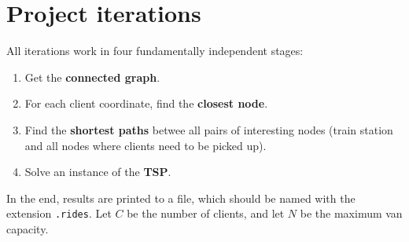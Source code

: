 \chapter{Project iterations} \label{iterations}

All iterations work in four fundamentally independent stages:
\begin{enumerate}
    \item Get the \textbf{connected graph}.
    \item For each client coordinate, find the \textbf{closest node}.
    \item Find the \textbf{shortest paths} betwee all pairs of interesting nodes (train station and all nodes where clients need to be picked up).
    \item Solve an instance of the \textbf{\acrlong*{TSP}}.
\end{enumerate}

In the end, results are printed to a file, which should be named with the extension \texttt{.rides}.
Let $C$ be the number of clients, and let $N$ be the maximum van capacity.

